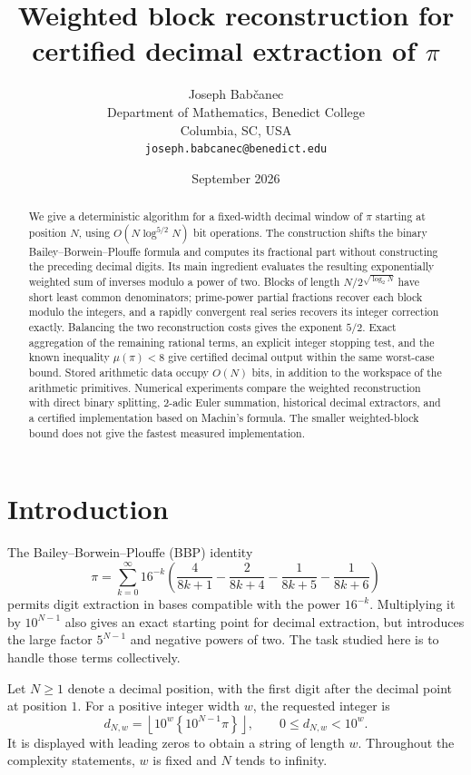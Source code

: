 \documentclass[11pt]{article}
\title{Weighted block reconstruction for\\
certified decimal extraction of $\pi$}
\author{Joseph Bab\v{c}anec\\[3pt]
  \small Department of Mathematics, Benedict College\\
  \small Columbia, SC, USA\\
  \small \texttt{joseph.babcanec@benedict.edu}}
\date{September 2026}
\numberwithin{equation}{section}
\theoremstyle{definition}
\newcommand{\fracpart}[1]{\left\{#1\right\}}
\begin{document}
\maketitle

\begin{abstract}
We give a deterministic algorithm for a fixed-width decimal window of
$\pi$ starting at position $N$, using $O(N\log^{5/2}N)$ bit operations.
The construction shifts the binary Bailey--Borwein--Plouffe formula and
computes its fractional part without constructing the preceding decimal
digits. Its main ingredient evaluates the resulting exponentially weighted
sum of inverses modulo a power of two. Blocks of length
$N/2^{\sqrt{\log_2 N}}$ have short least common denominators; prime-power
partial fractions recover each block modulo the integers, and a rapidly
convergent real series recovers its integer correction exactly. Balancing
the two reconstruction costs gives the exponent $5/2$. Exact aggregation
of the remaining rational terms, an explicit integer stopping test, and
the known inequality $\mu(\pi)<8$ give certified decimal output within
the same worst-case bound. Stored arithmetic data occupy $O(N)$ bits,
in addition to the workspace of the arithmetic primitives. Numerical
experiments compare the weighted reconstruction with direct binary
splitting, 2-adic Euler summation, historical decimal extractors, and
a certified implementation based on Machin's formula. The smaller
weighted-block bound does not give the fastest measured implementation.
\end{abstract}

\section{Introduction}

The Bailey--Borwein--Plouffe (BBP) identity \cite{BBP97}
\begin{equation}\label{eq:bbp}
 \pi=\sum_{k=0}^{\infty}16^{-k}
 \left(\frac{4}{8k+1}-\frac{2}{8k+4}
       -\frac{1}{8k+5}-\frac{1}{8k+6}\right)
\end{equation}
permits digit extraction in bases compatible with the power $16^{-k}$.
Multiplying it by $10^{N-1}$ also gives an exact starting point for
decimal extraction, but introduces the large factor $5^{N-1}$ and
negative powers of two. The task studied here is to handle those terms
collectively.

Let $N\ge 1$ denote a decimal position, with the first digit after the
decimal point at position $1$. For a positive integer width $w$, the
requested integer is
\begin{equation}\label{eq:window}
 d_{N,w}=\left\lfloor 10^w\fracpart{10^{N-1}\pi}\right\rfloor,
 \qquad 0\le d_{N,w}<10^w.
\end{equation}
It is displayed with leading zeros to obtain a string of length $w$.
Throughout the complexity statements, $w$ is fixed and $N$ tends to
infinity.
\end{document}
